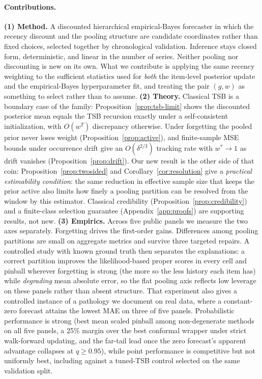 \documentclass[twocolumn,10pt]{article}
\begin{document}
\paragraph{Contributions.}
\textbf{(1) Method.} A discounted hierarchical empirical-Bayes forecaster
in which the recency discount and the pooling structure are candidate
coordinates rather than fixed choices, selected together by chronological
validation. Inference stays closed form, deterministic, and linear in the
number of series. Neither pooling nor discounting is new on its own. What
we contribute is applying the same recency weighting to the sufficient
statistics used for \emph{both} the item-level posterior update and the
empirical-Bayes hyperparameter fit, and treating the pair $(g,w)$ as
something to select rather than to assume.
\textbf{(2) Theory.} Classical TSB is a boundary case of the family:
Proposition~\ref{prop:tsb-limit} shows the discounted posterior mean
equals the TSB recursion exactly under a self-consistent initialization,
with $O(w^{T})$ discrepancy otherwise. Under forgetting the pooled prior
never loses weight (Proposition~\ref{prop:active}), and finite-sample MSE
bounds under occurrence drift give an $O(\delta^{2/3})$ tracking rate with
$w^{*}\!\to\!1$ as drift vanishes (Proposition~\ref{prop:drift}). Our new
result is the other side of that coin: Proposition~\ref{prop:twosided}
and Corollary~\ref{cor:resolution} give a \emph{practical estimability
condition}: the same reduction in effective sample size that keeps the
prior active also limits how finely a pooling partition can be resolved
from the window by this estimator. Classical credibility
(Proposition~\ref{prop:credibility}) and a finite-class selection
guarantee (Appendix~\ref{app:proofs}) are supporting results, not new.
\textbf{(3) Empirics.} Across five public panels we measure the two axes
separately. Forgetting drives the first-order gains. Differences among
pooling partitions are small on aggregate metrics and survive three
targeted repairs. A controlled study with known ground truth then
separates the explanations: a correct partition improves the
likelihood-based proper scores in every cell and pinball wherever
forgetting is strong (the more so the less history each item has) while
\emph{degrading} mean absolute error, so the flat pooling axis reflects
low leverage on these panels rather than absent structure. That
experiment also gives a controlled instance of a pathology we document on
real data, where a constant-zero forecast attains the lowest MAE on three
of five panels. Probabilistic performance is strong (best mean scaled
pinball among non-degenerate methods on all five panels, a 25\% margin
over the best conformal wrapper under strict walk-forward updating, and
the far-tail lead once the zero forecast's apparent advantage collapses
at $q\ge0.95$), while point performance is competitive but not uniformly
best, including against a tuned-TSB control selected on the same
validation split.
\end{document}
